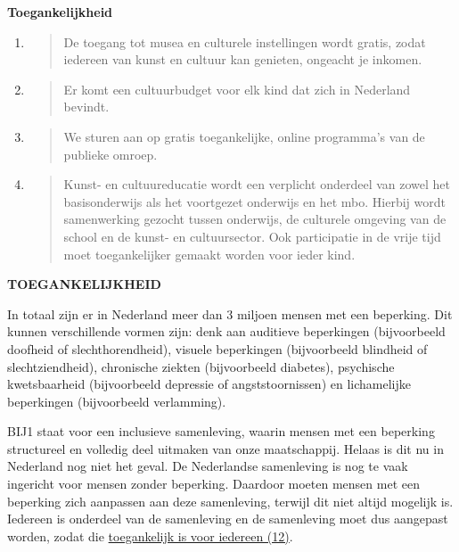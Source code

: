\textbf{Toegankelijkheid}

\begin{enumerate}
\def\labelenumi{\arabic{enumi}.}
\item
  \begin{quote}
  De toegang tot musea en culturele instellingen wordt gratis, zodat
  iedereen van kunst en cultuur kan genieten, ongeacht je inkomen.
  \end{quote}
\item
  \begin{quote}
  Er komt een cultuurbudget voor elk kind dat zich in Nederland bevindt.
  \end{quote}
\item
  \begin{quote}
  We sturen aan op gratis toegankelijke, online programma's van de
  publieke omroep.
  \end{quote}
\item
  \begin{quote}
  Kunst- en cultuureducatie wordt een verplicht onderdeel van zowel het
  basisonderwijs als het voortgezet onderwijs en het mbo. Hierbij wordt
  samenwerking gezocht tussen onderwijs, de culturele omgeving van de
  school en de kunst- en cultuursector. Ook participatie in de vrije
  tijd moet toegankelijker gemaakt worden voor ieder kind.
  \end{quote}
\end{enumerate}

\textbf{TOEGANKELIJKHEID}

In totaal zijn er in Nederland meer dan 3 miljoen mensen met een
beperking. Dit kunnen verschillende vormen zijn: denk aan auditieve
beperkingen (bijvoorbeeld doofheid of slechthorendheid), visuele
beperkingen (bijvoorbeeld blindheid of slechtziendheid), chronische
ziekten (bijvoorbeeld diabetes), psychische kwetsbaarheid (bijvoorbeeld
depressie of angststoornissen) en lichamelijke beperkingen (bijvoorbeeld
verlamming).

BIJ1 staat voor een inclusieve samenleving, waarin mensen met een
beperking structureel en volledig deel uitmaken van onze maatschappij.
Helaas is dit nu in Nederland nog niet het geval. De Nederlandse
samenleving is nog te vaak ingericht voor mensen zonder beperking.
Daardoor moeten mensen met een beperking zich aanpassen aan deze
samenleving, terwijl dit niet altijd mogelijk is. Iedereen is onderdeel
van de samenleving en de samenleving moet dus aangepast worden, zodat
die \underline{toegankelijk is voor iedereen (12)}.

